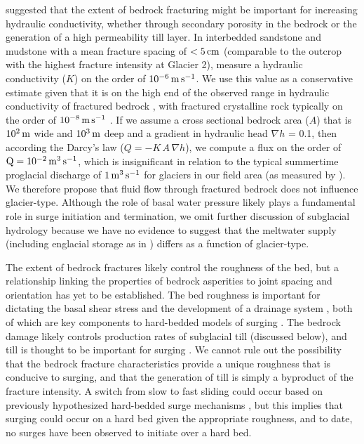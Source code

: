 \documentclass[draft,linenumbers]{agujournal}
\begin{document}
\cite{Post1969} suggested that the extent of bedrock fracturing might be important for increasing hydraulic conductivity, whether through secondary porosity in the bedrock or the generation of a high permeability till layer. In interbedded sandstone and mudstone with a mean fracture spacing of $\rm <5\,cm$ (comparable to the outcrop with the highest fracture intensity at Glacier 2), \citet{Surrette2008} measure a hydraulic conductivity ($K$) on the order of $\rm 10^{-6}\,m\,s^{-1}$. We use this value as a conservative estimate given that it is on the high end of the observed range in hydraulic conductivity of fractured bedrock \citep{Domenico1998}, with fractured crystalline rock typically on the order of $\rm 10^{-8}\,m\,s^{-1}$ \citep[e.g.]{Singhal2010}. If we assume a cross sectional bedrock area ($A$) that is $\rm10^2\,m$ wide and $\rm 10^3\,m$ deep and a gradient in hydraulic head $\nabla h$ = 0.1, then according the Darcy's law ($Q = -K\,A\,\nabla h$), we compute a flux on the order of  $\rm Q = 10^{-2}\,m^3\,s^{-1}$, which is insignificant in relation to the typical summertime proglacial discharge of $\rm 1\,m^3\,s^{-1}$ for glaciers in our field area (as measured by \cite{Crompton2016}). We therefore propose that fluid flow through fractured bedrock does not influence glacier-type. Although the role of basal water pressure likely plays a fundamental role in surge initiation and termination, we omit further discussion of subglacial hydrology because we have no evidence to suggest that the meltwater supply (including englacial storage as in \citet{Lingle2003}) differs as a function of glacier-type. 

The extent of bedrock fractures likely control the roughness of the bed, but a relationship linking the properties of bedrock asperities to joint spacing and orientation has yet to be established. The bed roughness is important for dictating the basal shear stress \citep{Weertman1957} and the development of a drainage system \citep{Lliboutry1976}, both of which are key components to hard-bedded models of surging \citep[e.g.][]{Fowler1987,Kamb1987}. The bedrock damage likely controls production rates of subglacial till (discussed below), and till is thought to be important for surging \citep[e.g.][]{Harrison2003}. We cannot rule out the possibility that the bedrock fracture characteristics provide a unique roughness that is conducive to surging, and that the generation of till is simply a byproduct of the fracture intensity. A switch from slow to fast sliding could occur based on previously hypothesized hard-bedded surge mechanisms \citep[e.g.][]{Fowler1987,Kamb1987}, but this implies that surging could occur on a hard bed given the appropriate roughness, and to date, no surges have been observed to initiate over a hard bed. 
\end{document}
